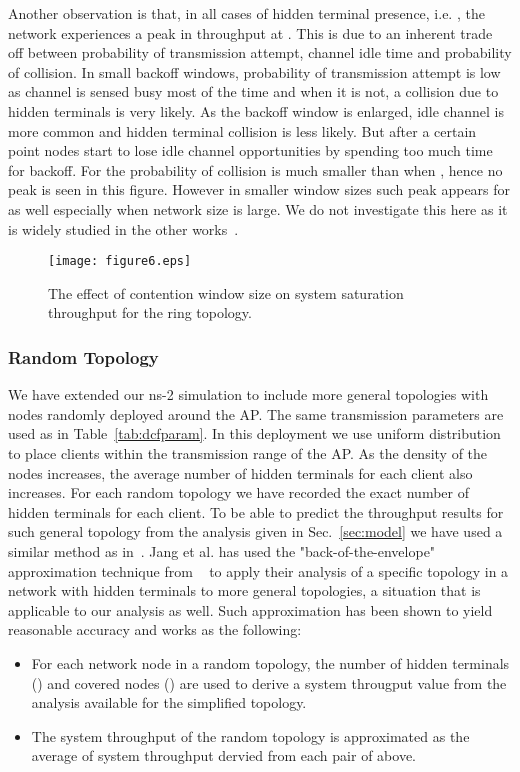 \documentclass[10pt,journal,cspaper,compsoc]{IEEEtran}
\begin{document}
Another observation is that, in all cases of hidden terminal presence, i.e. , the network experiences a peak in throughput at . This is due to an inherent trade off between probability of transmission attempt, channel idle time and probability of collision. In small backoff windows, probability of transmission attempt is low as channel is sensed busy most of the time and when it is not, a collision due to hidden terminals is very likely. As the backoff window is enlarged, idle channel is more common and hidden terminal collision is less likely. But after a certain point nodes start to lose idle channel opportunities by spending too much time for backoff. For  the probability of collision is much smaller than when , hence no peak is seen in this figure. However in smaller window sizes such peak appears for  as well especially when network size is large. We do not investigate this here as it is widely studied in the other works~\cite{bianchi,Dai13}.
 

\begin{figure}[!t]
\centering
\texttt{[image: figure6.eps]}
\caption{The effect of contention window size on system saturation throughput for the ring topology.}
\label{fig:thrWnh}
\end{figure} 







\subsubsection{Random Topology}
\label{sec:random}
We have extended our ns-2 simulation to include more general topologies with nodes randomly deployed around the AP. The same transmission parameters are used as in Table~\ref{tab:dcfparam}. In this deployment we use uniform distribution to place clients within the transmission range of the AP. As the density of the nodes increases, the average number of hidden terminals for each client also increases. For each random topology we have recorded the exact number of hidden terminals for each client. To be able to predict the throughput results for such general topology from the analysis given in Sec.~\ref{sec:model} we have used a similar method as in~\cite{Jang12}. Jang et al. has used the "back-of-the-envelope" approximation technique from ~\cite{Liew10} to apply their analysis of a specific topology in a network with hidden terminals to more general topologies, a situation that is applicable to our analysis as well. Such approximation has been shown to yield reasonable accuracy and works as the following:
\begin{itemize}
\item For each network node  in a random topology, the number of hidden terminals () and covered nodes () are used to derive a system througput value from the analysis available for the simplified topology.
\item The system throughput of the random topology is approximated as the average of system throughput dervied from each pair of  above. 
\end{itemize}
\end{document}
